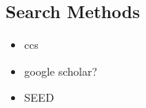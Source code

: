 \subsection{Search Methods}

\begin{itemize}
	\item ccs
	\item google scholar?
	\item SEED
\end{itemize}